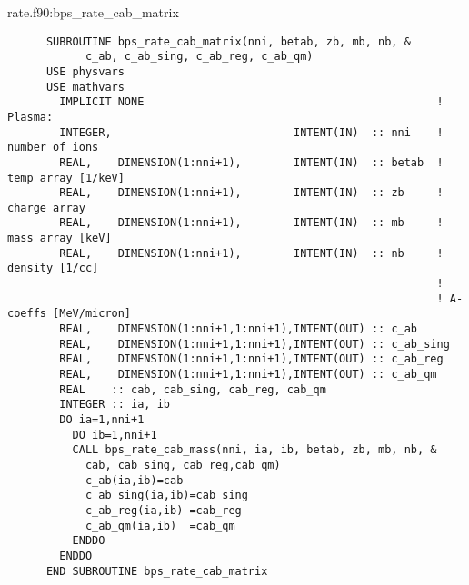 \documentclass[preprint,12pt,eqsecnum,nofootinbib,amsmath,amssymb]{revtex4}
\begin{document}
{{\vskip0.2cm 
\noindent
rate.f90:bps\_rate\_cab\_matrix
{
\baselineskip 10pt
\begin{verbatim}
      SUBROUTINE bps_rate_cab_matrix(nni, betab, zb, mb, nb, &
            c_ab, c_ab_sing, c_ab_reg, c_ab_qm)
      USE physvars
      USE mathvars    
        IMPLICIT NONE                                             ! Plasma:
        INTEGER,                            INTENT(IN)  :: nni    !  number of ions
        REAL,    DIMENSION(1:nni+1),        INTENT(IN)  :: betab  !  temp array [1/keV]
        REAL,    DIMENSION(1:nni+1),        INTENT(IN)  :: zb     !  charge array
        REAL,    DIMENSION(1:nni+1),        INTENT(IN)  :: mb     !  mass array [keV]
        REAL,    DIMENSION(1:nni+1),        INTENT(IN)  :: nb     !  density [1/cc]
                                                                  !
                                                                  ! A-coeffs [MeV/micron]
        REAL,    DIMENSION(1:nni+1,1:nni+1),INTENT(OUT) :: c_ab
        REAL,    DIMENSION(1:nni+1,1:nni+1),INTENT(OUT) :: c_ab_sing
        REAL,    DIMENSION(1:nni+1,1:nni+1),INTENT(OUT) :: c_ab_reg
        REAL,    DIMENSION(1:nni+1,1:nni+1),INTENT(OUT) :: c_ab_qm
        REAL    :: cab, cab_sing, cab_reg, cab_qm
        INTEGER :: ia, ib
        DO ia=1,nni+1
          DO ib=1,nni+1
          CALL bps_rate_cab_mass(nni, ia, ib, betab, zb, mb, nb, & 
            cab, cab_sing, cab_reg,cab_qm)  
            c_ab(ia,ib)=cab
            c_ab_sing(ia,ib)=cab_sing
            c_ab_reg(ia,ib) =cab_reg
            c_ab_qm(ia,ib)  =cab_qm   
          ENDDO
        ENDDO
      END SUBROUTINE bps_rate_cab_matrix
\end{verbatim}


}}}
\end{document}
